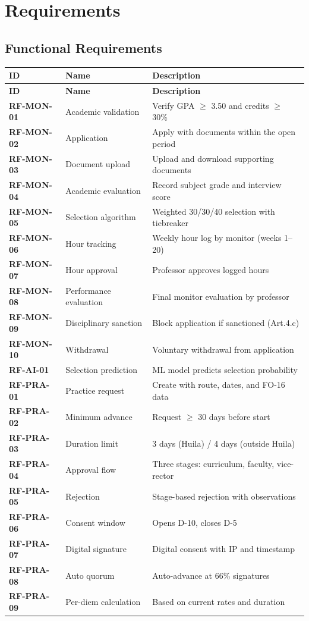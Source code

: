 \documentclass[12pt,a4paper]{article}
\begin{document}
\section{Requirements}

\subsection{Functional Requirements}
\begin{longtable}{>{\bfseries}p{2.5cm} p{5cm} p{5.5cm}}
  \toprule
  \textbf{ID} & \textbf{Name} & \textbf{Description} \\
  \midrule
  \endfirsthead
  \toprule \textbf{ID} & \textbf{Name} & \textbf{Description} \\ \midrule \endhead
  RF-MON-01 & Academic validation & Verify GPA $\geq$ 3.50 and credits $\geq$ 30\% \\
  RF-MON-02 & Application & Apply with documents within the open period \\
  RF-MON-03 & Document upload & Upload and download supporting documents \\
  RF-MON-04 & Academic evaluation & Record subject grade and interview score \\
  RF-MON-05 & Selection algorithm & Weighted 30/30/40 selection with tiebreaker \\
  RF-MON-06 & Hour tracking & Weekly hour log by monitor (weeks 1–20) \\
  RF-MON-07 & Hour approval & Professor approves logged hours \\
  RF-MON-08 & Performance evaluation & Final monitor evaluation by professor \\
  RF-MON-09 & Disciplinary sanction & Block application if sanctioned (Art.4.c) \\
  RF-MON-10 & Withdrawal & Voluntary withdrawal from application \\
  RF-AI-01  & Selection prediction & ML model predicts selection probability \\
  RF-PRA-01 & Practice request & Create with route, dates, and FO-16 data \\
  RF-PRA-02 & Minimum advance & Request $\geq$ 30 days before start \\
  RF-PRA-03 & Duration limit & 3 days (Huila) / 4 days (outside Huila) \\
  RF-PRA-04 & Approval flow & Three stages: curriculum, faculty, vice-rector \\
  RF-PRA-05 & Rejection & Stage-based rejection with observations \\
  RF-PRA-06 & Consent window & Opens D-10, closes D-5 \\
  RF-PRA-07 & Digital signature & Digital consent with IP and timestamp \\
  RF-PRA-08 & Auto quorum & Auto-advance at 66\% signatures \\
  RF-PRA-09 & Per-diem calculation & Based on current rates and duration \\
  \bottomrule
\end{longtable}
\end{document}
